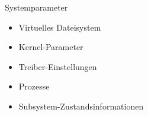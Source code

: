 \begin{frame}{Systemparameter}
\begin{itemize}
\item Virtuelles Dateisystem
\item Kernel-Parameter
\item Treiber-Einstellungen
\item Prozesse
\item Subsystem-Zustandsinformationen
\end{itemize}
\end{frame}